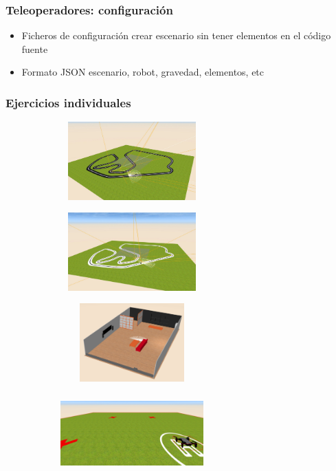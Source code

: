 \documentclass[xcolor={table}]{beamer}
\begin{document}
		\begin{frame}
			\frametitle{Teleoperadores: configuración}
			\newline
		    \begin{itemize}
		        \item Ficheros de configuración {\textrightarrow}  crear escenario sin tener elementos en el código fuente
		        \item Formato JSON {\textrightarrow } escenario,  robot, gravedad, elementos, etc 
		    \end{itemize}
		\end{frame}
		
		\begin{frame}
			\frametitle{Ejercicios individuales}
	  \begin{figure}[ht]
        \centering
          \begin{subfigure}{\textwidth}
            \includegraphics[width=5.5cm, height=3cm]{img/pibot_vision.JPG}
        \label{fig:vision}
        \end{subfigure}\hfill
        \begin{subfigure}{\textwidth}
            \includegraphics[width=5.5cm, height=3cm]{img/siguelineas_ir.JPG}
        \label{fig:ir}
        \end{subfigure}\hfill
        \begin{subfigure}{\textwidth}
            \includegraphics[width=5.5cm, height=3cm]{img/bump&go.png}
        \label{fig:chocagira}
        \end{subfigure}\hfill
        \begin{subfigure}{\textwidth}
            \includegraphics[width=5.5cm, height=3cm]{img/cuadradoDrone.png}
        \label{fig:cuadrado}
        \end{subfigure}
            \label{fig:ejercicios}
            \end{figure}
         \end{frame}
		
\end{document}
